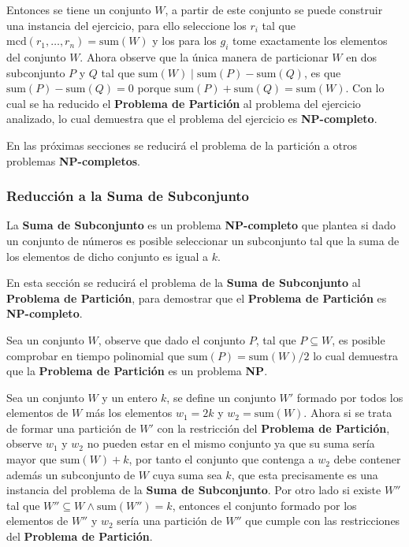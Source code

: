 \documentclass{article}
\begin{document}
Entonces se tiene un conjunto $W$, a partir de este conjunto se puede construir una instancia del ejercicio, para ello seleccione
los $r_i$ tal que $\text{mcd}(r_1,\ldots,r_n)=\text{sum}(W)$ y los para los $g_i$ tome exactamente los elementos del conjunto $W$. Ahora observe
que la única manera de particionar $W$ en dos subconjunto $P$ y $Q$ tal que $\text{sum}(W) \mid \text{sum}(P) - \text{sum}(Q)$, es que
$\text{sum}(P) - \text{sum}(Q)=0$ porque $\text{sum}(P) + \text{sum}(Q)=\text{sum}(W)$. Con lo cual se ha reducido el \textbf{Problema de Partición}
al problema del ejercicio analizado, lo cual demuestra que el problema del ejercicio es \textbf{NP-completo}.

En las próximas secciones se reducirá el problema de la partición a otros problemas \textbf{NP-completos}.

\subsubsection{Reducción a la Suma de Subconjunto}

La \textbf{Suma de Subconjunto} es un problema \textbf{NP-completo} que plantea si dado un conjunto de números es posible
seleccionar un subconjunto tal que la suma de los elementos de dicho conjunto es igual a $k$.

En esta sección se reducirá el problema de la \textbf{Suma de Subconjunto} al \textbf{Problema de Partición}, para demostrar
que el \textbf{Problema de Partición} es \textbf{NP-completo}.

Sea un conjunto $W$, observe que dado el conjunto $P$, tal que $P\subseteq W$, es posible comprobar en tiempo polinomial que $\text{sum}(P)=\text{sum}(W)/2$
lo cual demuestra que la \textbf{Problema de Partición} es un problema \textbf{NP}.

Sea un conjunto $W$ y un entero $k$, se define un conjunto $W'$ formado por todos los elementos de $W$ más los elementos
$w_1=2k$ y $w_2=\text{sum}(W)$. Ahora si se trata de formar una partición de $W'$ con la restricción del \textbf{Problema de Partición},
observe $w_1$ y $w_2$ no pueden estar en el mismo conjunto ya que su suma sería mayor que $\text{sum}(W)+k$, por tanto el conjunto
que contenga a $w_2$ debe contener además un subconjunto de $W$ cuya suma sea $k$, que esta precisamente es una instancia del problema de la \textbf{Suma de Subconjunto}.
Por otro lado si existe $W''$ tal que $W''\subseteq  W \wedge \text{sum}(W'')=k$, entonces el conjunto formado por los elementos de $W''$ y $w_2$
sería una partición de $W''$ que cumple con las restricciones del \textbf{Problema de Partición}.
\end{document}
